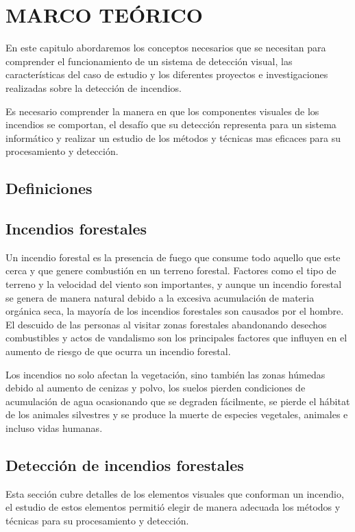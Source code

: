 \chapter{MARCO TEÓRICO}

En este capitulo abordaremos los conceptos necesarios que se necesitan para comprender el funcionamiento de un sistema de detección visual, las características del caso de estudio y los diferentes proyectos e investigaciones realizadas sobre la detección de incendios.

Es necesario comprender la manera en que los componentes visuales de los incendios se comportan, el desafío que su detección representa para un sistema informático y realizar un estudio de los métodos y técnicas mas eficaces para su procesamiento y detección.

\section{Definiciones}

\section{Incendios forestales}

Un incendio forestal es la presencia de fuego que consume todo aquello que este cerca y que genere combustión en un terreno forestal. Factores como el tipo de terreno y la velocidad del viento son importantes, y aunque un incendio forestal se genera de manera natural debido a la excesiva acumulación de materia orgánica seca, la mayoría de los incendios forestales son causados por el hombre. El descuido de las personas al visitar zonas forestales abandonando desechos combustibles y actos de vandalismo son los principales factores que influyen en el aumento de riesgo de que ocurra un incendio forestal. 

Los incendios no solo afectan la vegetación, sino también las zonas húmedas debido al aumento de cenizas y polvo, los suelos pierden condiciones de acumulación de agua ocasionando que se degraden fácilmente, se pierde el hábitat de los animales silvestres y se produce la muerte de especies vegetales, animales e incluso vidas humanas.

\section{Detección de incendios forestales}

Esta sección cubre detalles de los elementos visuales que conforman un incendio, el estudio de estos elementos permitió elegir de manera adecuada los métodos y técnicas para su procesamiento y detección.


